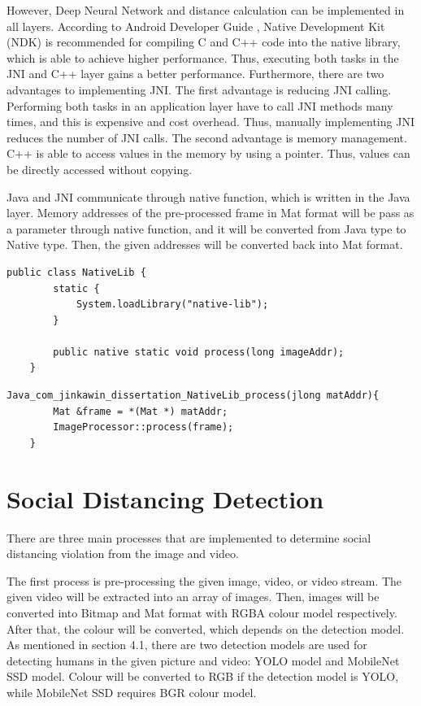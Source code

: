         However, Deep Neural Network and distance calculation can be implemented in all layers.
        According to Android Developer Guide \cite{ANDROID-01},
        Native Development Kit (NDK) is recommended for compiling C and C++ code into the native library,
        which is able to achieve higher performance.
        Thus, executing both tasks in the JNI and C++ layer gains a better performance.
        Furthermore, there are two advantages to implementing JNI.
            The first advantage is reducing JNI calling. Performing both tasks in an application layer have to call JNI methods many times,
                and this is expensive and cost overhead.
                Thus, manually implementing JNI reduces the number of JNI calls.
            The second advantage is memory management. C++ is able to access values in the memory by using a pointer.
                Thus, values can be directly accessed without copying.

        Java and JNI communicate through native function, which is written in the Java layer.
        Memory addresses of the pre-processed frame in Mat format will be pass as a parameter through native function,
        and it will be converted from Java type to Native type.
        Then, the given addresses will be converted back into Mat format.

\begin{lstlisting}[caption={Java Native Function},captionpos=b]
    public class NativeLib {
        static {
            System.loadLibrary("native-lib");
        }

        public native static void process(long imageAddr);
    }
\end{lstlisting}

\begin{lstlisting}[caption={C++ JNI Method},captionpos=b]
    Java_com_jinkawin_dissertation_NativeLib_process(jlong matAddr){
        Mat &frame = *(Mat *) matAddr;
        ImageProcessor::process(frame);
    }
\end{lstlisting}

    \section{Social Distancing Detection}
        There are three main processes that are implemented to determine social distancing violation from the image and video.

        The first process is pre-processing the given image, video, or video stream.
        The given video will be extracted into an array of images.
        Then, images will be converted into Bitmap and Mat format with RGBA colour model respectively.
        After that, the colour will be converted, which depends on the detection model.
        As mentioned in section 4.1, there are two detection models are used for detecting humans in the given picture and video: YOLO model and MobileNet SSD model.
        Colour will be converted to RGB if the detection model is YOLO,
        while MobileNet SSD requires BGR colour model.

